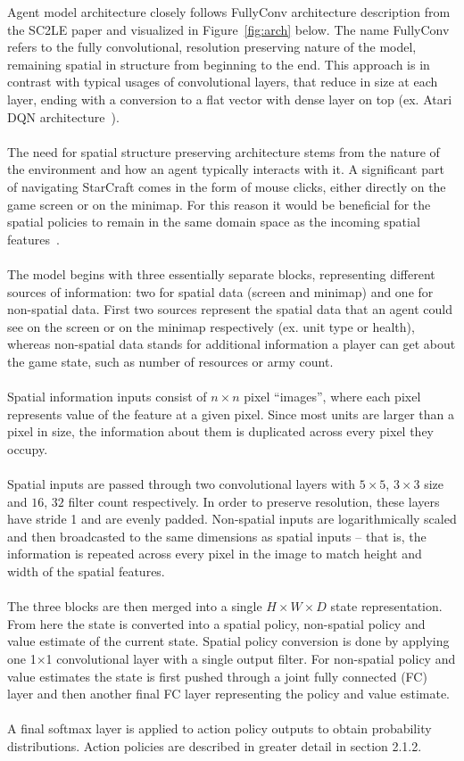 Agent model architecture closely follows FullyConv architecture description from the SC2LE paper and visualized in Figure~\ref{fig:arch} below. The name FullyConv refers to the fully convolutional, resolution preserving nature of the model, remaining spatial in structure from beginning to the end. This approach is in contrast with typical usages of convolutional layers, that reduce in size at each layer, ending with a conversion to a flat vector with dense layer on top (ex. Atari DQN architecture~\cite{Mnih2015}).
\\\\
The need for spatial structure preserving architecture stems from the nature of the environment and how an agent typically interacts with it. A significant part of navigating StarCraft comes in the form of mouse clicks, either directly on the game screen or on the minimap. For this reason it would be beneficial for the spatial policies to remain in the same domain space as the incoming spatial features~\cite{Vinyals2017}.
\\\\
The model begins with three essentially separate blocks, representing different sources of information: two for spatial data (screen and minimap) and one for non-spatial data. First two sources represent the spatial data that an agent could see on the screen or on the minimap respectively (ex. unit type or health), whereas non-spatial data stands for additional information a player can get about the game state, such as number of resources or army count. 
\\\\
Spatial information inputs consist of $n \times n$ pixel “images”, where each pixel represents value of the feature at a given pixel. Since most units are larger than a pixel in size, the information about them is duplicated across every pixel they occupy.
\\\\
Spatial inputs are passed through two convolutional layers with $5\times5$, $3\times3$ size and $16$, $32$ filter count respectively. In order to preserve resolution, these layers have stride 1 and are evenly padded. Non-spatial inputs are logarithmically scaled and then broadcasted to the same dimensions as spatial inputs -- that is, the information is repeated across every pixel in the image to match height and width of the spatial features.
\\\\
The three blocks are then merged into a single $H\times W \times D$ state representation. From here the state is converted into a spatial policy, non-spatial policy and value estimate of the current state. Spatial policy conversion is done by applying one 1$\times$1 convolutional layer with a single output filter. For non-spatial policy and value estimates the state is first pushed through a joint fully connected (FC) layer and then another final FC layer representing the policy and value estimate.
\\\\
A final softmax layer is applied to action policy outputs to obtain probability distributions. Action policies are described in greater detail in section 2.1.2.

